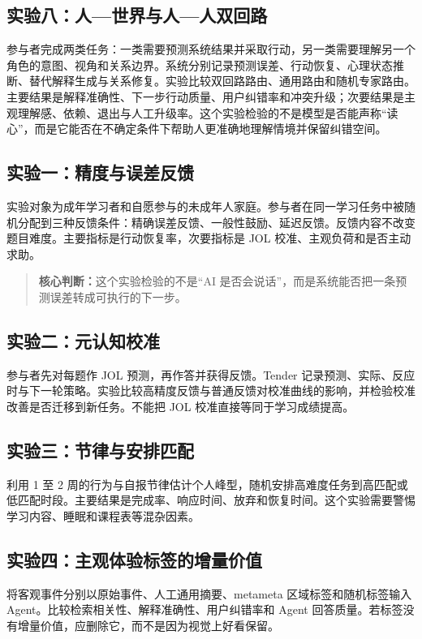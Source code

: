 \documentclass[UTF8,a4paper,11pt]{ctexart}
\newcommand{\keypoint}[1]{\begin{quote}\noindent\textbf{\color{TenderBlue}核心判断：}#1\end{quote}}
\begin{document}
\subsection{实验八：人—世界与人—人双回路}

参与者完成两类任务：一类需要预测系统结果并采取行动，另一类需要理解另一个角色的意图、视角和关系边界。系统分别记录预测误差、行动恢复、心理状态推断、替代解释生成与关系修复。实验比较双回路路由、通用路由和随机专家路由。主要结果是解释准确性、下一步行动质量、用户纠错率和冲突升级；次要结果是主观理解感、依赖、退出与人工升级率。这个实验检验的不是模型是否能声称“读心”，而是它能否在不确定条件下帮助人更准确地理解情境并保留纠错空间。

\subsection{实验一：精度与误差反馈}

实验对象为成年学习者和自愿参与的未成年人家庭。参与者在同一学习任务中被随机分配到三种反馈条件：精确误差反馈、一般性鼓励、延迟反馈。反馈内容不改变题目难度。主要指标是行动恢复率，次要指标是 JOL 校准、主观负荷和是否主动求助。

\keypoint{这个实验检验的不是“AI 是否会说话”，而是系统能否把一条预测误差转成可执行的下一步。}

\subsection{实验二：元认知校准}

参与者先对每题作 JOL 预测，再作答并获得反馈。Tender 记录预测、实际、反应时与下一轮策略。实验比较高精度反馈与普通反馈对校准曲线的影响，并检验校准改善是否迁移到新任务。不能把 JOL 校准直接等同于学习成绩提高。

\subsection{实验三：节律与安排匹配}

利用 1 至 2 周的行为与自报节律估计个人峰型，随机安排高难度任务到高匹配或低匹配时段。主要结果是完成率、响应时间、放弃和恢复时间。这个实验需要警惕学习内容、睡眠和课程表等混杂因素。

\subsection{实验四：主观体验标签的增量价值}

将客观事件分别以原始事件、人工通用摘要、metameta 区域标签和随机标签输入 Agent。比较检索相关性、解释准确性、用户纠错率和 Agent 回答质量。若标签没有增量价值，应删除它，而不是因为视觉上好看保留。
\end{document}
